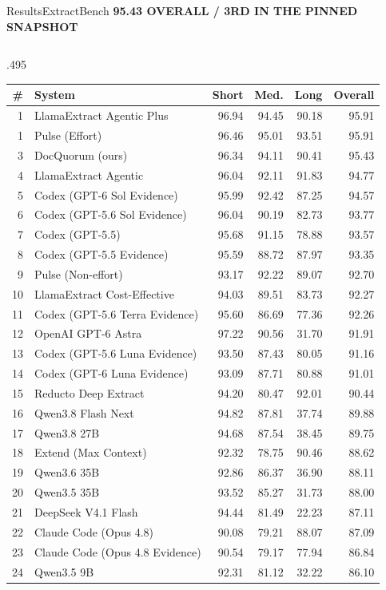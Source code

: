 \documentclass[aspectratio=1610,11pt]{beamer}
\newcommand{\tagline}[1]{{\scriptsize\color{teal}\bfseries #1}\par\vspace{1mm}}
\begin{document}
\begin{frame}{Results\quad ExtractBench}
\tagline{95.43 OVERALL / 3RD IN THE PINNED SNAPSHOT}
{\fontsize{5.5}{6.4}\selectfont\setlength{\tabcolsep}{1.5pt}\renewcommand{\arraystretch}{1.07}
\begin{columns}[T]
\begin{column}{.495\linewidth}
\begin{tabularx}{\linewidth}{@{}rXrrrr@{}}\toprule
\# & System & Short & Med. & Long & Overall\\\midrule
1 & LlamaExtract Agentic Plus & 96.94 & 94.45 & 90.18 & 95.91 \\
1 & Pulse (Effort) & 96.46 & 95.01 & 93.51 & 95.91 \\
\rowcolor{mint} 3 & DocQuorum (ours) & 96.34 & 94.11 & 90.41 & 95.43 \\
4 & LlamaExtract Agentic & 96.04 & 92.11 & 91.83 & 94.77 \\
5 & Codex (GPT-6 Sol Evidence) & 95.99 & 92.42 & 87.25 & 94.57 \\
6 & Codex (GPT-5.6 Sol Evidence) & 96.04 & 90.19 & 82.73 & 93.77 \\
7 & Codex (GPT-5.5) & 95.68 & 91.15 & 78.88 & 93.57 \\
8 & Codex (GPT-5.5 Evidence) & 95.59 & 88.72 & 87.97 & 93.35 \\
9 & Pulse (Non-effort) & 93.17 & 92.22 & 89.07 & 92.70 \\
10 & LlamaExtract Cost-Effective & 94.03 & 89.51 & 83.73 & 92.27 \\
11 & Codex (GPT-5.6 Terra Evidence) & 95.60 & 86.69 & 77.36 & 92.26 \\
12 & OpenAI GPT-6 Astra & 97.22 & 90.56 & 31.70 & 91.91 \\
13 & Codex (GPT-5.6 Luna Evidence) & 93.50 & 87.43 & 80.05 & 91.16 \\
14 & Codex (GPT-6 Luna Evidence) & 93.09 & 87.71 & 80.88 & 91.01 \\
15 & Reducto Deep Extract & 94.20 & 80.47 & 92.01 & 90.44 \\
16 & Qwen3.8 Flash Next & 94.82 & 87.81 & 37.74 & 89.88 \\
17 & Qwen3.8 27B & 94.68 & 87.54 & 38.45 & 89.75 \\
18 & Extend (Max Context) & 92.32 & 78.75 & 90.46 & 88.62 \\
19 & Qwen3.6 35B & 92.86 & 86.37 & 36.90 & 88.11 \\
20 & Qwen3.5 35B & 93.52 & 85.27 & 31.73 & 88.00 \\
21 & DeepSeek V4.1 Flash & 94.44 & 81.49 & 22.23 & 87.11 \\
22 & Claude Code (Opus 4.8) & 90.08 & 79.21 & 88.07 & 87.09 \\
23 & Claude Code (Opus 4.8 Evidence) & 90.54 & 79.17 & 77.94 & 86.84 \\
24 & Qwen3.5 9B & 92.31 & 81.12 & 32.22 & 86.10 \\


\end{tabularx}
\end{column}
\end{columns}}
\end{frame}
\end{document}
